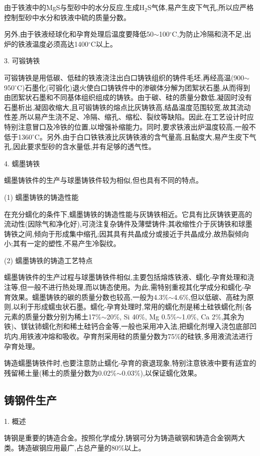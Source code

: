 \documentclass[UTF8]{ctexbook}
\newcommand{\◎}{\ensuremath{\bigcirc}}
\begin{document}
由于铁液中的MgS与型砂中的水分反应,生成H$_2$S气体,易产生皮下气孔,所以应严格控制型砂中水分和铁液中硫的质量分数。

另外,由于铁液经球化和孕育处理后温度要降低50$\sim$100$^{\circ}$C,为防止冷隔和浇不足,出炉的铁液温度必须高达1400$^{\circ}$C以上。

3. 可锻铸铁

可锻铸铁是用低碳、低硅的铁液浇注出白口铸铁组织的铸件毛坯,再经高温(900$\sim$950$^{\circ}$C)石墨化(可锻化)退火使白口铸铁件中的渗碳体分解为团絮状石墨,从而得到由团絮状石墨和不同基体组织组成的铸铁。由于碳、硅的质量分数低,凝固时没有石墨析出,凝固收缩大,且可锻铸铁的熔点比灰铸铁高,结晶温度范围较宽,故其流动性差,所以易产生浇不足、冷隔、缩孔、缩松、裂纹等缺陷。因此,在工艺设计时应特别注意冒口及冷铁的位置,以增强补缩能力。同时,要求铁液出炉温度较高,一般不低于1360$^{\circ}$C。另外,由于白口铁铁液比灰铸铁液的含气量高,且黏度大,易产生皮下气孔,因此要求型砂的含水量低,并有足够的透气性。

4. 蠕墨铸铁

蠕墨铸铁件的生产与球墨铸铁件较为相似,但也具有不同的特点。

(1) 蠕墨铸铁的铸造性能

在充分蠕化的条件下,蠕墨铸铁的铸造性能与灰铸铁相近。它具有比灰铸铁更高的流动性(因除气和净化好),可浇注复杂铸件及薄壁铸件;其收缩性介于灰铸铁和球墨铸铁之间,倾向于形成集中缩孔;因其具有共晶成分或接近于共晶成分,故热裂倾向小;其有一定的塑性,不易产生冷裂纹。

(2) 蠕墨铸铁的铸造工艺特点

蠕墨铸铁件的生产过程与球墨铸铁件相似,主要包括熔炼铁液、蠕化-孕育处理和浇注等,但一般不进行热处理,而以铸态使用。为此,需特别重视其化学成分和蠕化-孕育效果。蠕墨铸铁的碳的质量分数也较高,一般为4.3\%$\sim$4.6\%,但以低碳、高硅为原则,以利于形成蠕虫状石墨。蠕化-孕育处理时,常用的蠕化剂是稀土硅铁蠕化剂(各元素的质量分数分别为稀土17\%$\sim$20\%, Si 40\%, Mg 0.5\%$\sim$1.0\%, Ca 2\%,其余为铁)、镁钛铈蠕化剂和稀土硅钙合金等,一般也采用冲入法,把蠕化剂埋入浇包底部凹坑内,用铁液冲熔和吸收。孕育剂采用硅的质量分数为75\%的硅铁,多用液流法进行孕育处理。

铸造蠕墨铸铁件时,也要注意防止蠕化-孕育的衰退现象,特别注意铁液中要有适宜的残留稀土量(稀土的质量分数为0.02\%$\sim$0.03\%),以保证蠕化效果。

\subsection{铸钢件生产}

1. 概述

铸钢是重要的铸造合金。按照化学成分,铸钢可分为铸造碳钢和铸造合金钢两大类。铸造碳钢应用最广,占总产量的80\%以上。
\end{document}
